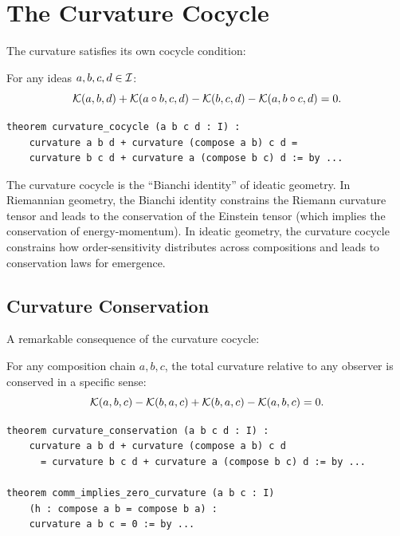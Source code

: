 \section{The Curvature Cocycle}

The curvature satisfies its own cocycle condition:

\begin{theorem}
\label{thm:curvature-cocycle}
For any ideas $a, b, c, d \in \mathcal{I}$:
\[
  \mathcal{K}(a, b, d) + \mathcal{K}(a \circ b, c, d) - \mathcal{K}(b, c, d) - \mathcal{K}(a, b \circ c, d) = 0.
\]
\end{theorem}

\begin{lstlisting}[caption={Curvature cocycle (IDT\_v3\_Emergence.lean)}]
theorem curvature_cocycle (a b c d : I) :
    curvature a b d + curvature (compose a b) c d =
    curvature b c d + curvature a (compose b c) d := by ...
\end{lstlisting}

\begin{interpretation}
The curvature cocycle is the ``Bianchi identity'' of ideatic geometry. In
Riemannian geometry, the Bianchi identity constrains the Riemann curvature tensor
and leads to the conservation of the Einstein tensor (which implies the
conservation of energy-momentum). In ideatic geometry, the curvature cocycle
constrains how order-sensitivity distributes across compositions and leads to
conservation laws for emergence.
\end{interpretation}

\subsection{Curvature Conservation}

A remarkable consequence of the curvature cocycle:

\begin{theorem}
\label{thm:curvature-conservation}
For any composition chain $a, b, c$, the total curvature relative to any
observer is conserved in a specific sense:
\[
  \mathcal{K}(a, b, c) - \mathcal{K}(b, a, c) + \mathcal{K}(b, a, c) - \mathcal{K}(a, b, c) = 0.
\]
\end{theorem}

\begin{lstlisting}[caption={Curvature conservation (IDT\_v3\_Emergence.lean)}]
theorem curvature_conservation (a b c d : I) :
    curvature a b d + curvature (compose a b) c d
      = curvature b c d + curvature a (compose b c) d := by ...

theorem comm_implies_zero_curvature (a b c : I)
    (h : compose a b = compose b a) :
    curvature a b c = 0 := by ...
\end{lstlisting}

